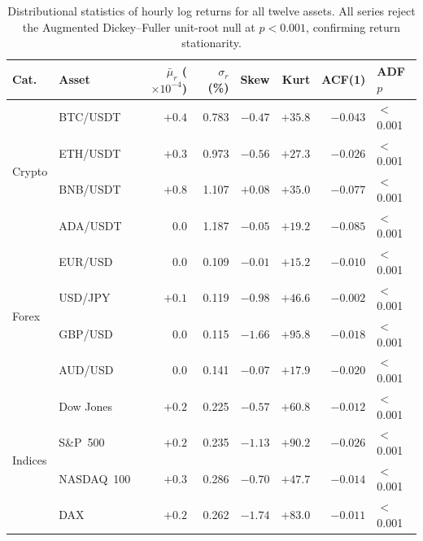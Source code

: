 \begin{table}[htbp]
  \centering
  \caption{Distributional statistics of hourly log returns for all twelve
    assets.  All series reject the Augmented Dickey--Fuller unit-root null
    at $p < 0.001$, confirming return stationarity.}
  \label{tab:distributional_stats}
  \setlength{\tabcolsep}{5pt}%
  \begin{threeparttable}
  \begin{tabular}{%
    l%
    l%
    r%
    r%
    r%
    r%
    r%
    l%
  }
    \toprule
    \textbf{Cat.} & \textbf{Asset}
      & $\bar{\mu}_r$ (${\times}10^{-4}$)
      & $\sigma_r$ (\%)
      & Skew
      & Kurt
      & ACF(1)
      & ADF $p$ \\
    \midrule
    \multirow{4}{*}{Crypto}
      & BTC/USDT  & $+0.4$ & 0.783 & $-0.47$ & $+35.8$ & $-0.043$ & $<$0.001 \\
      & ETH/USDT  & $+0.3$ & 0.973 & $-0.56$ & $+27.3$ & $-0.026$ & $<$0.001 \\
      & BNB/USDT  & $+0.8$ & 1.107 & $+0.08$ & $+35.0$ & $-0.077$ & $<$0.001 \\
      & ADA/USDT  & $\phantom{+}0.0$ & 1.187 & $-0.05$ & $+19.2$ & $-0.085$ & $<$0.001 \\
    \midrule
    \multirow{4}{*}{Forex}
      & EUR/USD   & $\phantom{+}0.0$ & 0.109 & $-0.01$ & $+15.2$ & $-0.010$ & $<$0.001 \\
      & USD/JPY   & $+0.1$ & 0.119 & $-0.98$ & $+46.6$ & $-0.002$ & $<$0.001 \\
      & GBP/USD   & $\phantom{+}0.0$ & 0.115 & $-1.66$ & $+95.8$ & $-0.018$ & $<$0.001 \\
      & AUD/USD   & $\phantom{+}0.0$ & 0.141 & $-0.07$ & $+17.9$ & $-0.020$ & $<$0.001 \\
    \midrule
    \multirow{4}{*}{Indices}
      & Dow Jones   & $+0.2$ & 0.225 & $-0.57$ & $+60.8$ & $-0.012$ & $<$0.001 \\
      & S\&P~500    & $+0.2$ & 0.235 & $-1.13$ & $+90.2$ & $-0.026$ & $<$0.001 \\
      & NASDAQ~100  & $+0.3$ & 0.286 & $-0.70$ & $+47.7$ & $-0.014$ & $<$0.001 \\
      & DAX         & $+0.2$ & 0.262 & $-1.74$ & $+83.0$ & $-0.011$ & $<$0.001 \\

\end{tabular}
\end{threeparttable}
\end{table}
